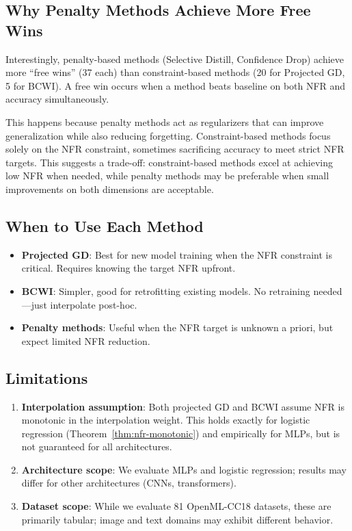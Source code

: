\documentclass[12pt, letterpaper]{article}
\theoremstyle{remark}
\begin{document}
\subsection{Why Penalty Methods Achieve More Free Wins}

Interestingly, penalty-based methods (Selective Distill, Confidence Drop) achieve more ``free wins'' (37 each) than constraint-based methods (20 for Projected GD, 5 for BCWI). A free win occurs when a method beats baseline on both NFR and accuracy simultaneously.

This happens because penalty methods act as regularizers that can improve generalization while also reducing forgetting. Constraint-based methods focus solely on the NFR constraint, sometimes sacrificing accuracy to meet strict NFR targets. This suggests a trade-off: constraint-based methods excel at achieving low NFR when needed, while penalty methods may be preferable when small improvements on both dimensions are acceptable.

\subsection{When to Use Each Method}

\begin{itemize}
\item \textbf{Projected GD}: Best for new model training when the NFR constraint is critical. Requires knowing the target NFR upfront.
\item \textbf{BCWI}: Simpler, good for retrofitting existing models. No retraining needed---just interpolate post-hoc.
\item \textbf{Penalty methods}: Useful when the NFR target is unknown a priori, but expect limited NFR reduction.
\end{itemize}

\subsection{Limitations}

\begin{enumerate}
\item \textbf{Interpolation assumption}: Both projected GD and BCWI assume NFR is monotonic in the interpolation weight. This holds exactly for logistic regression (Theorem~\ref{thm:nfr-monotonic}) and empirically for MLPs, but is not guaranteed for all architectures.
\item \textbf{Architecture scope}: We evaluate MLPs and logistic regression; results may differ for other architectures (CNNs, transformers).
\item \textbf{Dataset scope}: While we evaluate 81 OpenML-CC18 datasets, these are primarily tabular; image and text domains may exhibit different behavior.
\end{enumerate}
\end{document}
